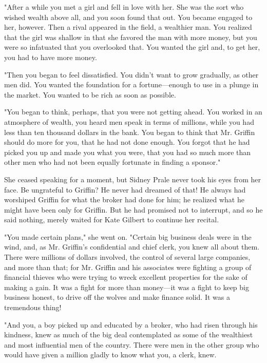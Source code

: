 \documentclass{novel}
\begin{document}
"After a while you met a girl and fell in love with her. She was the sort who wished wealth above all, and you soon found that out. You became engaged to her, however. Then a rival appeared in the field, a wealthier man. You realized that the girl was shallow in that she favored the man with more money, but you were so infatuated that you overlooked that. You wanted the girl and, to get her, you had to have more money.

"Then you began to feel dissatisfied. You didn't want to grow gradually, as other men did. You wanted the foundation for a fortune---enough to use in a plunge in the market. You wanted to be rich as soon as possible.

"You began to think, perhaps, that you were not getting ahead. You worked in an atmosphere of wealth, you heard men speak in terms of millions, while you had less than ten thousand dollars in the bank. You began to think that Mr. Griffin should do more for you, that he had not done enough. You forgot that he had picked you up and made you what you were, that you had so much more than other men who had not been equally fortunate in finding a sponsor."

She ceased speaking for a moment, but Sidney Prale never took his eyes from her face. Be ungrateful to Griffin? He never had dreamed of that! He always had worshiped Griffin for what the broker had done for him; he realized what he might have been only for Griffin. But he had promised not to interrupt, and so he said nothing, merely waited for Kate Gilbert to continue her recital.

"You made certain plans," she went on. "Certain big business deals were in the wind, and, as Mr. Griffin's confidential and chief clerk, you knew all about them. There were millions of dollars involved, the control of several large companies, and more than that; for Mr. Griffin and his associates were fighting a group of financial thieves who were trying to wreck excellent properties for the sake of making a gain. It was a fight for more than money---it was a fight to keep big business honest, to drive off the wolves and make finance solid. It was a tremendous thing!

"And you, a boy picked up and educated by a broker, who had risen through his kindness, knew as much of the big deal contemplated as some of the wealthiest and most influential men of the country. There were men in the other group who would have given a million gladly to know what you, a clerk, knew.
\end{document}
